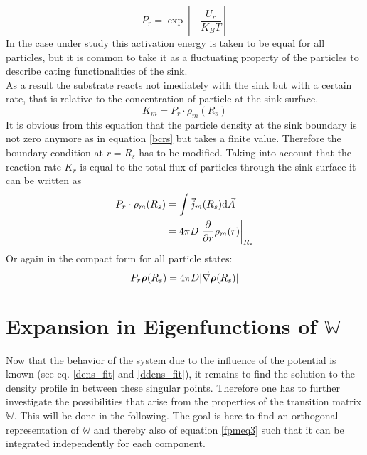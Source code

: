 \begin{equation}
    P_r = \exp\left[- \frac{U_r}{K_B T} \right]
    \label{reaction_arrhenius_factor}
\end{equation}
In the case under study this activation energy is taken to be equal for all particles, but it is common to take it as a fluctuating property of the particles to describe cating functionalities of the sink. \cite{Szabo1982} \\
As a result the substrate reacts not imediately with the sink but with a certain rate, that is relative to the concentration of particle at the sink surface.
\begin{equation}
    K_m = P_r \cdot \rho_m(R_s)
    \label{sink_reaction_rate}
\end{equation}
It is obvious from this equation that the particle density at the sink boundary is not zero anymore as in equation \eqref{bcrs} but takes a finite value. Therefore the boundary condition at $r=R_s$ has to be modified.
Taking into account that the reaction rate $K_r$ is equal to the total flux of particles through the sink surface it can be written as
\begin{align}
    P_r \cdot \rho_m(R_s) &= \int \vec{j}_m(R_s) {\rm d} \vec{A} \nonumber \\
    &= 4 \pi D \left.\frac{\partial}{\partial r} \rho_m(r)\right|_{R_s}
    \label{nbcrs}
\end{align}
Or again in the compact form for all particle states:
\begin{equation}
    P_r \boldsymbol{\mathbf{\rho}}(R_s) = 4 \pi D |\vec{\nabla} \boldsymbol{\mathbf{\rho}}(R_s)|
    \label{nbcrsall}
\end{equation}
\section{Expansion in Eigenfunctions of $\mathbb{W}$}
\label{Expansion_in_Eigenfunctions}
Now that the behavior of the system due to the influence of the potential is known (see eq. \eqref{dens_fit} and \eqref{ddens_fit}), it remains to find the solution to the density profile in between these singular points. Therefore one has to further investigate the possibilities that arise from the properties of the transition matrix $\mathbb{W}$. This will be done in the following. The goal is here to find an orthogonal representation of $\mathbb{W}$ and thereby also of equation \eqref{fpmeq3} such that it can be integrated independently for each component.\\

